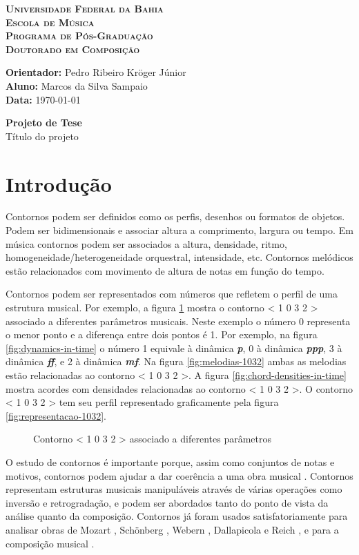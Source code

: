 \documentclass[12pt]{article}
\newcommand{\cabecalho}[0]{
  \textbf{\textsc{Universidade Federal da Bahia}} \\
  \textbf{\textsc{Escola de Música}} \\
  \textbf{\textsc{Programa de Pós-Graduação}} \\
  \textbf{\textsc{Doutorado em Composição}} \par
  \vspace*{1ex}
  \textbf{Orientador:} Pedro Ribeiro Kröger Júnior\\
  \textbf{Aluno: } Marcos da Silva Sampaio \\
  \textbf{Data: } \today
  \thispagestyle{empty}
}
\newcommand{\titulo}[1]{
  \vspace{1cm}
  \begin{center}{
      \Huge \textbf{Projeto de Tese} \\
    }
    \vspace{12pt}
    {\Large #1}
  \end{center}
  \vspace{1cm}
}
\begin{document}
\cabecalho
\titulo{Título do projeto}


\section{Introdução}
\label{sec:introducao}

Contornos podem ser definidos como os perfis, desenhos ou formatos de
objetos. Podem ser bidimensionais e associar altura a comprimento,
largura ou tempo. Em música contornos podem ser associados a altura,
densidade, ritmo, homogeneidade/heterogeneidade orquestral,
intensidade, etc. Contornos melódicos estão relacionados com movimento
de altura de notas em função do tempo.

Contornos podem ser representados com números que refletem o perfil de
uma estrutura musical. Por exemplo, a figura \ref{fig:representacoes}
mostra o contorno < 1 0 3 2 > associado a diferentes parâmetros
musicais. Neste exemplo o número 0 representa o menor ponto e a
diferença entre dois pontos é 1. Por exemplo, na figura
\ref{fig:dynamics-in-time} o número 1 equivale à dinâmica
\textbf{\textit{p}}, 0 à dinâmica \textbf{\textit{ppp}}, 3 à dinâmica
\textbf{\textit{ff}}, e 2 à dinâmica \textbf{\textit{mf}}. Na figura
\ref{fig:melodias-1032} ambas as melodias estão relacionadas ao
contorno < 1 0 3 2 >. A figura \ref{fig:chord-densities-in-time} mostra
acordes com densidades relacionadas ao contorno < 1 0 3 2 >. O contorno
< 1 0 3 2 > tem seu perfil representado graficamente pela figura
\ref{fig:representacao-1032}.

\begin{figure}[h]
  \centering
  \quad

  \subfloat[Altura]{
    \texttt{[image: ly-1032]}
    \label{fig:melodias-1032}
  }
  \caption{Contorno < 1 0 3 2 > associado a diferentes parâmetros}
  \label{fig:representacoes}
\end{figure}

O estudo de contornos é importante porque, assim como conjuntos de
notas e motivos, contornos podem ajudar a dar coerência a uma obra
musical \cite{clifford95:contour}. Contornos representam estruturas
musicais manipuláveis através de várias operações como inversão e
retrogradação, e podem ser abordados tanto do ponto de vista da
análise quanto da composição. Contornos já foram usados
satisfatoriamente para analisar obras de Mozart
\cite{beard03:contour}, Schönberg \cite{friedmann85:methodology},
Webern \cite{clifford95:contour,sampaio08:analise}, Dallapicola
\cite{marvin88:generalized} e Reich \cite{quinn97:fuzzy}, e para a
composição musical \cite{sampaio08:em}.
\end{document}
